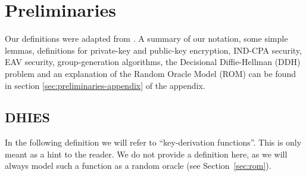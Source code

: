 \section{Preliminaries}

Our definitions were adapted from \cite{introduction-to-modern-cryptography}. A summary of our notation, some simple lemmas, definitions for private-key and public-key encryption, IND-CPA security, EAV security, group-generation algorithms, the Decisional Diffie-Hellman (DDH) problem and an explanation of the Random Oracle Model (ROM) can be found in section \ref{sec:preliminaries-appendix} of the appendix.

\subsection{DHIES}

In the following definition we will refer to ``key-derivation functions''. This is only meant as a hint to the reader. We do not provide a definition here, as we will always model such a function as a random oracle (see Section~\ref{sec:rom}).

